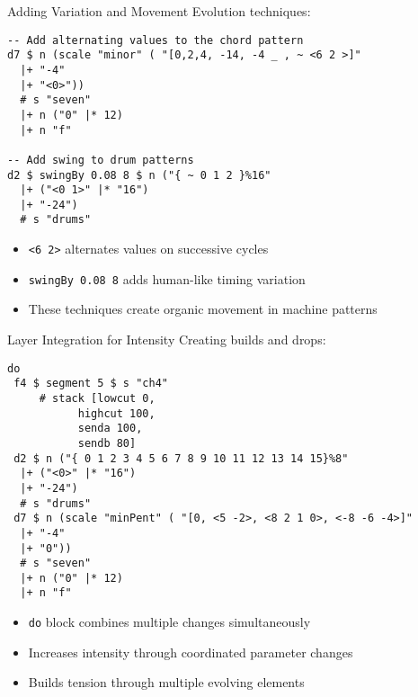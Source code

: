 \documentclass{beamer}
\begin{document}
\begin{frame}[fragile]{Adding Variation and Movement}
Evolution techniques:

\begin{lstlisting}[style=tidal]
-- Add alternating values to the chord pattern
d7 $ n (scale "minor" ( "[0,2,4, -14, -4 _ , ~ <6 2 >]" 
  |+ "-4" 
  |+ "<0>"))
  # s "seven" 
  |+ n ("0" |* 12) 
  |+ n "f" 

-- Add swing to drum patterns
d2 $ swingBy 0.08 8 $ n ("{ ~ 0 1 2 }%16" 	
  |+ ("<0 1>" |* "16")
  |+ "-24")
  # s "drums" 
\end{lstlisting}

\begin{itemize}
    \item \texttt{<6 2>} alternates values on successive cycles
    \item \texttt{swingBy 0.08 8} adds human-like timing variation
    \item These techniques create organic movement in machine patterns
\end{itemize}
\end{frame}

\begin{frame}[fragile]{Layer Integration for Intensity}
Creating builds and drops:

\begin{lstlisting}[style=tidal]
do
 f4 $ segment 5 $ s "ch4"  
     # stack [lowcut 0,
           highcut 100,
           senda 100,
           sendb 80]
 d2 $ n ("{ 0 1 2 3 4 5 6 7 8 9 10 11 12 13 14 15}%8" 
  |+ ("<0>" |* "16")
  |+ "-24")
  # s "drums" 
 d7 $ n (scale "minPent" ( "[0, <5 -2>, <8 2 1 0>, <-8 -6 -4>]" 
  |+ "-4" 
  |+ "0"))
  # s "seven" 
  |+ n ("0" |* 12) 
  |+ n "f" 
\end{lstlisting}

\begin{itemize}
    \item \texttt{do} block combines multiple changes simultaneously
    \item Increases intensity through coordinated parameter changes
    \item Builds tension through multiple evolving elements
\end{itemize}
\end{frame}


\end{document}
